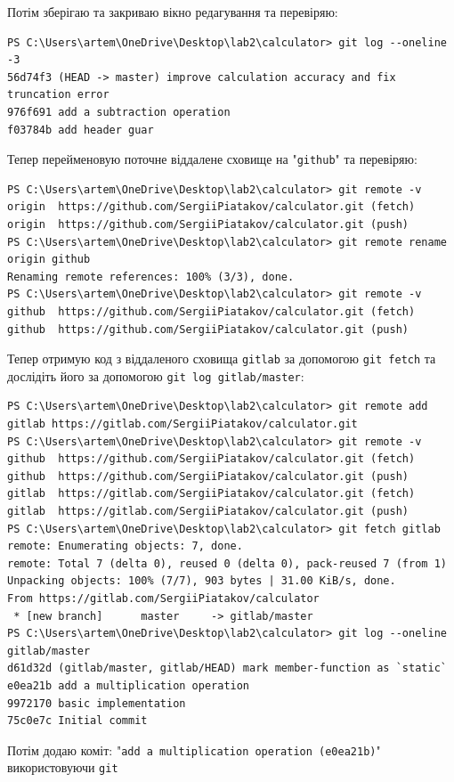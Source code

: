 \documentclass[a4paper,12pt]{article}
\begin{document}
    Потім зберігаю та закриваю вікно редагування та перевіряю:
    \begin{verbatim}
PS C:\Users\artem\OneDrive\Desktop\lab2\calculator> git log --oneline -3 
56d74f3 (HEAD -> master) improve calculation accuracy and fix truncation error
976f691 add a subtraction operation
f03784b add header guar
    \end{verbatim}

    Тепер перейменовую поточне віддалене сховище на "\texttt{github}" та перевіряю:
    \begin{verbatim}
PS C:\Users\artem\OneDrive\Desktop\lab2\calculator> git remote -v 
origin  https://github.com/SergiiPiatakov/calculator.git (fetch)
origin  https://github.com/SergiiPiatakov/calculator.git (push)
PS C:\Users\artem\OneDrive\Desktop\lab2\calculator> git remote rename origin github 
Renaming remote references: 100% (3/3), done.
PS C:\Users\artem\OneDrive\Desktop\lab2\calculator> git remote -v
github  https://github.com/SergiiPiatakov/calculator.git (fetch)
github  https://github.com/SergiiPiatakov/calculator.git (push)
    \end{verbatim}

    Тепер отримую код з віддаленого сховища \texttt{gitlab} за допомогою \texttt{git fetch} та дослідіть його за допомогою \texttt{git log gitlab/master}:
    \begin{verbatim}
PS C:\Users\artem\OneDrive\Desktop\lab2\calculator> git remote add gitlab https://gitlab.com/SergiiPiatakov/calculator.git
PS C:\Users\artem\OneDrive\Desktop\lab2\calculator> git remote -v
github  https://github.com/SergiiPiatakov/calculator.git (fetch)
github  https://github.com/SergiiPiatakov/calculator.git (push)
gitlab  https://gitlab.com/SergiiPiatakov/calculator.git (fetch)
gitlab  https://gitlab.com/SergiiPiatakov/calculator.git (push)
PS C:\Users\artem\OneDrive\Desktop\lab2\calculator> git fetch gitlab
remote: Enumerating objects: 7, done.
remote: Total 7 (delta 0), reused 0 (delta 0), pack-reused 7 (from 1)
Unpacking objects: 100% (7/7), 903 bytes | 31.00 KiB/s, done.
From https://gitlab.com/SergiiPiatakov/calculator
 * [new branch]      master     -> gitlab/master
PS C:\Users\artem\OneDrive\Desktop\lab2\calculator> git log --oneline gitlab/master
d61d32d (gitlab/master, gitlab/HEAD) mark member-function as `static`
e0ea21b add a multiplication operation
9972170 basic implementation
75c0e7c Initial commit
    \end{verbatim}

    Потім додаю коміт: "\texttt{add a multiplication operation (e0ea21b)}" використовуючи \texttt{git}
\end{document}
